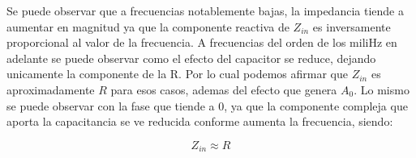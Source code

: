 Se puede observar que a frecuencias notablemente bajas, la impedancia tiende a aumentar en magnitud ya que la componente reactiva de 
$Z_{in}$ es inversamente proporcional al valor de la frecuencia.
A frecuencias del orden de los miliHz en adelante se puede observar como el efecto del capacitor se reduce, dejando unicamente la componente de la R. Por lo cual 
podemos afirmar que $Z_{in}$ es aproximadamente $R$ para esos casos, ademas del efecto que genera $A_0$.
Lo mismo se puede observar con la fase que tiende a 0, ya que la componente compleja que aporta la capacitancia se ve reducida conforme aumenta la frecuencia, siendo:

$$Z_{in} \approx R$$